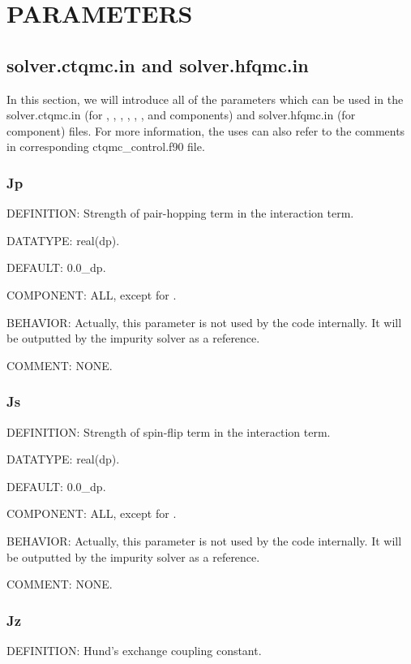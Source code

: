 \chapter{PARAMETERS}
\section{solver.ctqmc.in and solver.hfqmc.in}

In this section, we will introduce all of the parameters which can be used in the solver.ctqmc.in (for {\azalea}, {\gardenia}, {\narcissus}, {\begonia}, {\lavender}, {\pansy}, and {\manjushaka} components) and solver.hfqmc.in (for {\daisy} component) files. For more information, the uses can also refer to the comments in corresponding ctqmc\_control.f90 file.

\subsection{Jp}
{\color{red}DEFINITION:} Strength of pair-hopping term in the interaction term.

{\color{green}DATATYPE:} real(dp).

{\color{blue}DEFAULT:} 0.0\_dp.

{\color{brown}COMPONENT:} ALL, except for {\daisy}.

{\color{purple}BEHAVIOR:} Actually, this parameter is not used by the code internally. It will be outputted by the impurity solver as a reference.

{\color{olive}COMMENT:} NONE.

\subsection{Js}
{\color{red}DEFINITION:} Strength of spin-flip term in the interaction term.

{\color{green}DATATYPE:} real(dp).

{\color{blue}DEFAULT:} 0.0\_dp.

{\color{brown}COMPONENT:} ALL, except for {\daisy}.

{\color{purple}BEHAVIOR:} Actually, this parameter is not used by the code internally. It will be outputted by the impurity solver as a reference.

{\color{olive}COMMENT:} NONE.

\subsection{Jz}
{\color{red}DEFINITION:} Hund's exchange coupling constant.

